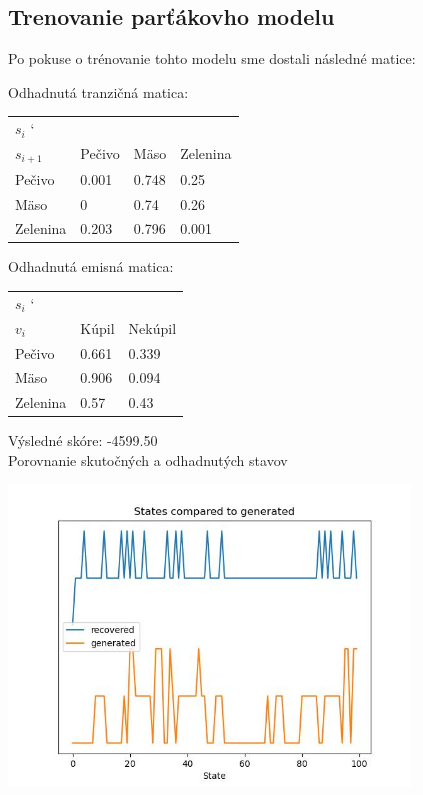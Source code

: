 \documentclass[a4paper]{article}
\begin{document}
\newpage

\subsection*{Trenovanie parťákovho modelu}

Po pokuse o trénovanie tohto modelu sme dostali následné matice:

Odhadnutá tranzičná matica:

\begin{table}[h!]
	\begin{tabular}{|l|l|l|l|}
		\hline
		$s_i$ \char`\\ $s_{i+1}$ & Pečivo   & Mäso   & Zelenina   \\ \hline
		Pečivo              & 0.001 & 0.748 & 0.25   \\ \hline
		Mäso                & 0 & 0.74 & 0.26 \\ \hline
		Zelenina            & 0.203   & 0.796 & 0.001 \\ \hline
	\end{tabular}
\end{table}

Odhadnutá emisná matica:

\begin{table}[h!]
	\begin{tabular}{|l|l|l|}
		\hline
		$s_i$ \char`\\ $v_i$ & Kúpil  & Nekúpil     \\ \hline
		Pečivo                & 0.661 & 0.339  \\ \hline
		Mäso               & 0.906  & 0.094  \\ \hline
		Zelenina               & 0.57 & 0.43  \\ \hline
	\end{tabular}
\end{table}

Výsledné skóre: -4599.50
\\

Porovnanie skutočných a odhadnutých stavov

\includegraphics[width=0.8\textwidth]{odhad_stavov.jpg}
\end{document}
